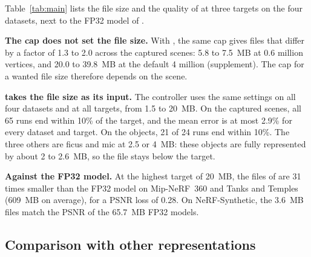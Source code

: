 Table~\ref{tab:main} lists the file size and the quality of \BM at three targets on the four datasets, next to the FP32 model of \MS.

\noindent\textbf{The cap does not set the file size.} With \MSc, the same cap gives files that differ by a factor of 1.3 to 2.0 across the captured scenes: 5.8 to 7.5~MB at 0.6 million vertices, and 20.0 to 39.8~MB at the default 4 million (supplement). The cap for a wanted file size therefore depends on the scene.

\noindent\textbf{\BM takes the file size as its input.} The controller uses the same settings on all four datasets and at all targets, from 1.5 to 20~MB. On the captured scenes, all 65 runs end within 10\% of the target, and the mean error is at most 2.9\% for every dataset and target. On the objects, 21 of 24 runs end within 10\%. The three others are ficus and mic at 2.5 or 4~MB: these objects are fully represented by about 2 to 2.6~MB, so the file stays below the target.

\noindent\textbf{Against the FP32 model.} At the highest target of 20~MB, the files of \BM are 31 times smaller than the FP32 model on Mip-NeRF~360 and Tanks and Temples (609~MB on average), for a PSNR loss of 0.28\dB. On NeRF-Synthetic, the 3.6~MB files match the PSNR of the 65.7~MB FP32 models.

\subsection{Comparison with other representations}
\label{sec:cross}

